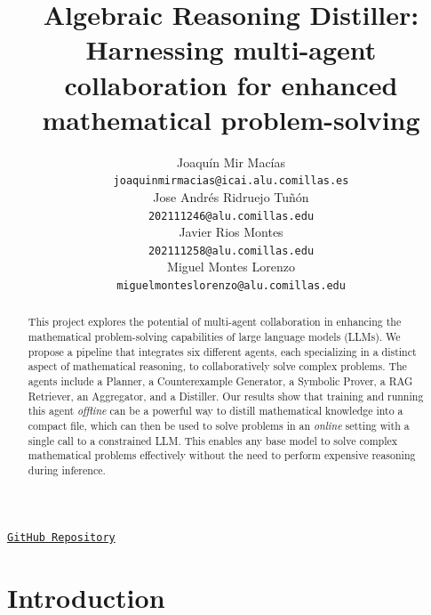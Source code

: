 \documentclass{article}
\title{Algebraic Reasoning Distiller: Harnessing multi-agent collaboration for enhanced mathematical problem-solving}
\author{%
  Joaquín Mir Macías \\
  \texttt{joaquinmirmacias@icai.alu.comillas.es} \\
  \And
  Jose Andrés Ridruejo Tuñón \\
  \texttt{202111246@alu.comillas.edu} \\
  \And
  Javier Rios Montes \\
  \texttt{202111258@alu.comillas.edu} \\
  \And
  Miguel Montes Lorenzo \\
  \texttt{miguelmonteslorenzo@alu.comillas.edu} \\
}
\begin{document}
\maketitle
\vspace{-2em}
\begin{center}
  \href{https://github.com/joaquinmaciias/Algebraic-Reasoning-Distiller}{\texttt{GitHub Repository}}
\end{center}

\begin{abstract}
  This project explores the potential of multi-agent collaboration in enhancing the mathematical problem-solving capabilities of large language models (LLMs). We propose a pipeline that integrates six different agents, each specializing in a distinct aspect of mathematical reasoning, to collaboratively solve complex problems. The agents include a Planner, a Counterexample Generator, a Symbolic Prover, a RAG Retriever, an Aggregator, and a Distiller. Our results show that training and running this agent \textit{offline} can be a powerful way to distill mathematical knowledge into a compact file, which can then be used to solve problems in an \textit{online} setting with a single call to a constrained LLM. This enables any base model to solve complex mathematical problems effectively without the need to perform expensive reasoning during inference.
\end{abstract}

\section{Introduction}

\end{document}
